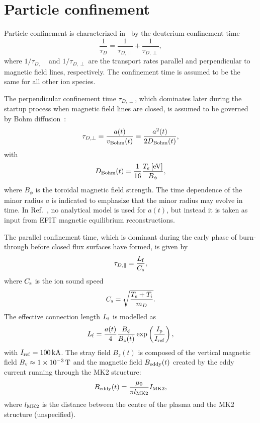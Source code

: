 \documentclass{notes}
\newcommand{\IMK}{I_{\rm MK2}}
\newcommand{\Ip}{I_{\rm p}}
\begin{document}
    \section{Particle confinement}\label{sec:confinement}
    Particle confinement is characterized in \DYON\ by the deuterium confinement
    time
    \begin{equation}
        \frac{1}{\tau_D} = \frac{1}{\tau_{D,\|}} + \frac{1}{\tau_{D,\perp}},
    \end{equation}
    where $1/\tau_{D,\|}$ and $1/\tau_{D,\perp}$ are the transport rates
    parallel and perpendicular to magnetic field lines, respectively. The
    confinement time is assumed to be the same for all other ion species.

    The perpendicular confinement time $\tau_{D,\perp}$, which dominates later
    during the startup process when magnetic field lines are closed, is assumed
    to be governed by Bohm diffusion~\cite{delaCal2006}:
    \begin{equation}\label{eq:tauPerp}
        \tau_{D,\perp} = \frac{a(t)}{v_{\rm Bohm}(t)} = \frac{a^2(t)}{2D_{\rm Bohm}(t)},
    \end{equation}
    with
    \begin{equation}
        D_{\rm Bohm}(t) = \frac{1}{16}\frac{T_e\,\mathrm{[eV]}}{B_\phi},
    \end{equation}
    where $B_\phi$ is the toroidal magnetic field strength. The time dependence
    of the minor radius $a$ is indicated to emphasize that the minor radius may
    evolve in time. In Ref.~\cite{Kim2012}, no analytical model is used for
    $a(t)$, but instead it is taken as input from EFIT magnetic equilibrium
    reconstructions.

    The parallel confinement time, which is dominant during the early phase of
    burn-through before closed flux surfaces have formed, is given by
    \begin{equation}
        \tau_{D,\|} = \frac{L_{\rm f}}{C_{\rm s}},
    \end{equation}
    where $C_{\rm s}$ is the ion sound speed
    \begin{equation}
        C_{\rm s} = \sqrt{\frac{T_e + T_i}{m_D}}.
    \end{equation}
    The effective connection length $L_{\rm f}$ is modelled as
    \begin{equation}\label{eq:Lf}
        L_{\rm f} = \frac{a(t)}{4}\frac{B_\phi}{B_z(t)}\exp\left( \frac{\Ip}{I_{\rm ref}} \right),
    \end{equation}
    with $I_{\rm ref} = \SI{100}{kA}$. The stray field $B_z(t)$ is composed of
    the vertical magnetic field $B_{\rm v}\approx\SI{1e-3}{T}$ and the magnetic
    field $B_{\rm eddy}(t)$ created by the eddy current running through the MK2
    structure:
    \begin{equation}
        B_{\rm eddy}(t) = \frac{\mu_0}{\pi l_{\rm MK2}}\IMK,
    \end{equation}
    where $l_{\rm MK2}$ is the distance between the centre of the plasma and
    the MK2 structure (unspecified).
\end{document}
